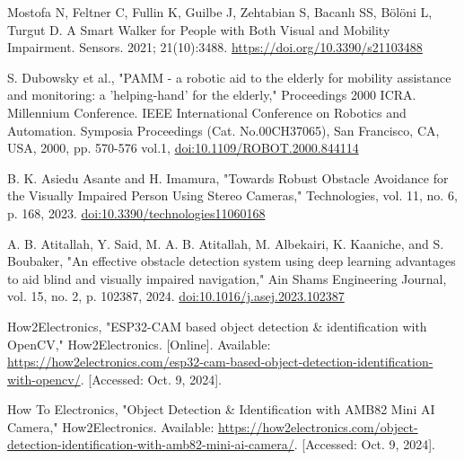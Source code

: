 \begin{thebibliography}{45}
	
	 Mostofa N, Feltner C, Fullin K, Guilbe J, Zehtabian S, Bacanlı SS, Bölöni L, Turgut D. A Smart Walker for People with Both Visual and Mobility Impairment. Sensors. 2021; 21(10):3488. \href{https://doi.org/10.3390/s21103488}{https://doi.org/10.3390/s21103488}
	
	 S. Dubowsky et al., "PAMM - a robotic aid to the elderly for mobility assistance and monitoring: a 'helping-hand' for the elderly," Proceedings 2000 ICRA. Millennium Conference. IEEE International Conference on Robotics and Automation. Symposia Proceedings (Cat. No.00CH37065), San Francisco, CA, USA, 2000, pp. 570-576 vol.1, \href{https://doi.org/10.1109/ROBOT.2000.844114}{doi:10.1109/ROBOT.2000.844114}
	
	 B. K. Asiedu Asante and H. Imamura, "Towards Robust Obstacle Avoidance for the Visually Impaired Person Using Stereo Cameras," Technologies, vol. 11, no. 6, p. 168, 2023. \href{https://doi.org/10.3390/technologies11060168}{doi:10.3390/technologies11060168}
	
	 A. B. Atitallah, Y. Said, M. A. B. Atitallah, M. Albekairi, K. Kaaniche, and S. Boubaker, "An effective obstacle detection system using deep learning advantages to aid blind and visually impaired navigation," Ain Shams Engineering Journal, vol. 15, no. 2, p. 102387, 2024. \href{https://doi.org/10.1016/j.asej.2023.102387}{doi:10.1016/j.asej.2023.102387}
	
	 How2Electronics, "ESP32-CAM based object detection \& identification with OpenCV," How2Electronics. [Online]. Available: \href{https://how2electronics.com/esp32-cam-based-object-detection-identification-with-opencv/}{https://how2electronics.com/esp32-cam-based-object-detection-identification-with-opencv/}. [Accessed: Oct. 9, 2024].
	
	 How To Electronics, "Object Detection \& Identification with AMB82 Mini AI Camera," How2Electronics. Available: \href{https://how2electronics.com/object-detection-identification-with-amb82-mini-ai-camera/}{https://how2electronics.com/object-detection-identification-with-amb82-mini-ai-camera/}. [Accessed: Oct. 9, 2024].
	

\end{thebibliography}
